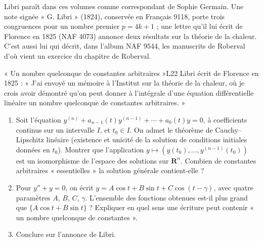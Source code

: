 \documentclass[11pt,a4paper]{article}
\begin{document}
Libri paraît dans ces volumes comme correspondant de Sophie Germain. Une note
signée « G. Libri » (1824), conservée en Français 9118, porte trois congruences
pour un nombre premier $p = 4k + 1$ ; une lettre qu'il lui écrit de Florence en
1825 (NAF 4073) annonce deux résultats sur la théorie de la chaleur. C'est aussi
lui qui décrit, dans l'album NAF 9544, les manuscrits de Roberval d'où vient un
exercice du chapitre de Roberval.

\begin{exercice}{« Un nombre quelconque de constantes arbitraires »}{L2}{2}
Libri écrit de Florence en 1825 : « J'ai envoyé un mémoire à l'Institut sur la
théorie de la chaleur, où je crois avoir démontré qu'on peut donner à l'intégrale
d'une équation différentielle linéaire un nombre quelconque de constantes
arbitraires. »
\begin{enumerate}
\item Soit l'équation $y^{(n)} + a_{n-1}(t)y^{(n-1)} + \cdots + a_0(t)y = 0$, à
  coefficients continus sur un intervalle $I$, et $t_0 \in I$. On admet le théorème
  de Cauchy--Lipschitz linéaire (existence et unicité de la solution de conditions
  initiales données en $t_0$). Montrer que l'application
  $y \mapsto (y(t_0), \dots, y^{(n-1)}(t_0))$ est un isomorphisme de l'espace des
  solutions sur $\mathbf{R}^n$. Combien de constantes arbitraires « essentielles » la
  solution générale contient-elle ?
\item Pour $y'' + y = 0$, on écrit $y = A\cos t + B\sin t + C\cos(t - \gamma)$, avec
  quatre paramètres $A$, $B$, $C$, $\gamma$. L'ensemble des fonctions obtenues est-il
  plus grand que $\{A\cos t + B\sin t\}$ ? Expliquer en quel sens une écriture peut
  contenir « un nombre quelconque de constantes ».
\item Conclure sur l'annonce de Libri.
\end{enumerate}
\end{exercice}
\end{document}
